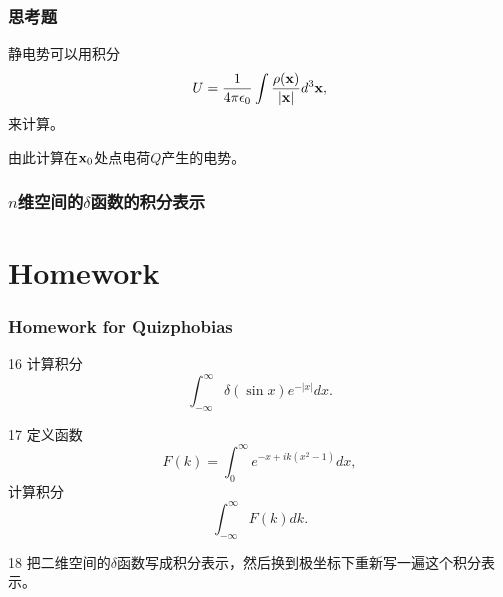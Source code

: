 \documentclass[CJK]{beamer}
\begin{document}
\begin{frame}
  \frametitle{思考题}
  静电势可以用积分
  $$U = \frac{1}{4\pi\epsilon_0} \int \frac{\rho({\mathbf{x}})}{|{\mathbf{x}}|} d^3{\mathbf{x}}, $$
  来计算。

  \skipline
  
  由此计算在${\mathbf{x}}_0$处点电荷$Q$产生的电势。
\end{frame}


\begin{frame}
  \frametitle{$n$维空间的$\delta$函数的积分表示}
  

\end{frame}



\section{Homework}

\begin{frame}
  \frametitle{Homework for Quizphobias}
  
  \bitem
\item[16]{计算积分$$\int_{-\infty}^\infty \delta\left(\sin x\right) e^{-|x|} dx.$$ }
\item[17]{定义函数
  $$ F(k) = \int_0^\infty e^{-x+ik(x^2-1)} dx, $$
  计算积分
  $$ \int_{-\infty}^\infty F(k) dk. $$}
\item[18]{把二维空间的$\delta$函数写成积分表示，然后换到极坐标下重新写一遍这个积分表示。}  
  \eitem
  
\end{frame}



\ech
\end{document}
